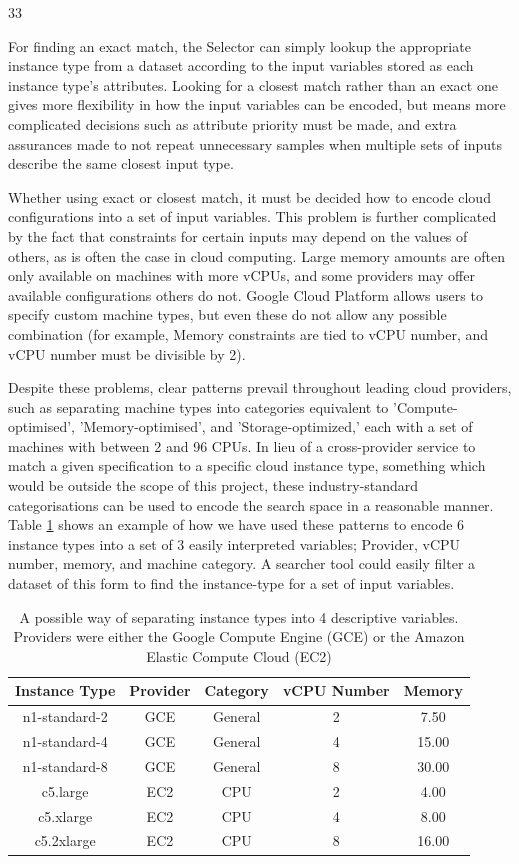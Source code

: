 33\documentclass{article}
\begin{document}
For finding an exact match, the Selector can simply lookup the appropriate instance type from a dataset according to the input variables stored as each instance type's attributes. Looking for a closest match rather than an exact one gives more flexibility in how the input variables can be encoded, but means more complicated decisions such as attribute priority must be made, and extra assurances made to not repeat unnecessary samples when multiple sets of inputs describe the same closest input type.

Whether using exact or closest match, it must be decided how to encode cloud configurations into a set of input variables. This problem is further complicated by the fact that constraints for certain inputs may depend on the values of others, as is often the case in cloud computing. Large memory amounts are often only available on machines with more vCPUs, and some providers may offer available configurations others do not. Google Cloud Platform allows users to specify custom machine types, but even these do not allow any possible combination (for example, Memory constraints are tied to vCPU number, and vCPU number must be divisible by 2).

Despite these problems, clear patterns prevail throughout leading cloud providers, such as separating machine types into categories equivalent to 'Compute-optimised', 'Memory-optimised', and 'Storage-optimized,' each with a set of machines with between 2 and 96 CPUs. In lieu of a cross-provider service to match a given specification to a specific cloud instance type, something which would be outside the scope of this project, these industry-standard categorisations can be used to encode the search space in a reasonable manner. Table \ref{tab:config-encode} shows an example of how we have used these patterns to encode 6 instance types into a set of 3 easily interpreted variables; Provider, vCPU number, memory, and machine category. A searcher tool could easily filter a dataset of this form to find the instance-type for a set of input variables.

\begin{table}[!t]
\centering
\begin{tabular}{ |c||c|c|c|c|  }
 \hline
 Instance Type & Provider & Category & vCPU Number & Memory \\
 \hline
 n1-standard-2    & GCE  & General & 2 & 7.50 \\
 n1-standard-4    & GCE  & General & 4 & 15.00 \\
 n1-standard-8    & GCE  & General & 8 & 30.00 \\
 c5.large         & EC2  & CPU & 2 & 4.00 \\
 c5.xlarge    & EC2  & CPU & 4 & 8.00 \\
 c5.2xlarge    & EC2  & CPU & 8 & 16.00 \\
 \hline
\end{tabular}
\caption{A possible way of separating instance types into 4 descriptive variables. Providers were either the Google Compute Engine (GCE) or the Amazon Elastic Compute Cloud (EC2)}
\label{tab:config-encode}
\end{table}
\end{document}
